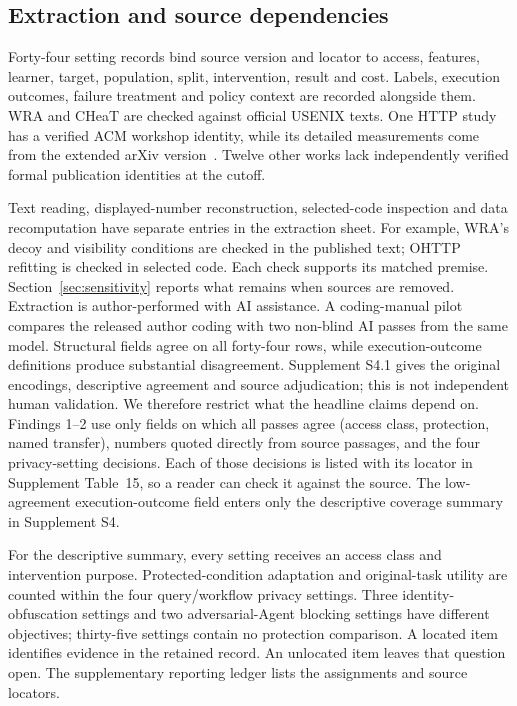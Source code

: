 \subsection{Extraction and source dependencies}
Forty-four setting records bind source version and locator to access, features, learner, target, population, split, intervention, result and cost. Labels, execution outcomes, failure treatment and policy context are recorded alongside them. WRA and CHeaT are checked against official USENIX texts. One HTTP study has a verified ACM workshop identity, while its detailed measurements come from the extended arXiv version~\cite{borysenko2026http,borysenko2026short}. Twelve other works lack independently verified formal publication identities at the cutoff.

Text reading, displayed-number reconstruction, selected-code inspection and data recomputation have separate entries in the extraction sheet. For example, WRA's decoy and visibility conditions are checked in the published text; OHTTP refitting is checked in selected code. Each check supports its matched premise. Section~\ref{sec:sensitivity} reports what remains when sources are removed. Extraction is author-performed with AI assistance. A coding-manual pilot compares the released author coding with two non-blind AI passes from the same model. Structural fields agree on all forty-four rows, while execution-outcome definitions produce substantial disagreement. Supplement S4.1 gives the original encodings, descriptive agreement and source adjudication; this is not independent human validation. We therefore restrict what the headline claims depend on. Findings 1--2 use only fields on which all passes agree (access class, protection, named transfer), numbers quoted directly from source passages, and the four privacy-setting decisions. Each of those decisions is listed with its locator in Supplement Table~15, so a reader can check it against the source. The low-agreement execution-outcome field enters only the descriptive coverage summary in Supplement S4.

For the descriptive summary, every setting receives an access class and intervention purpose. Protected-condition adaptation and original-task utility are counted within the four query/workflow privacy settings. Three identity-obfuscation settings and two adversarial-Agent blocking settings have different objectives; thirty-five settings contain no protection comparison. A located item identifies evidence in the retained record. An unlocated item leaves that question open. The supplementary reporting ledger lists the assignments and source locators.

